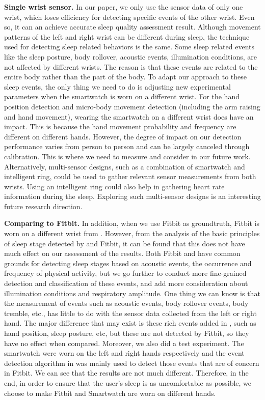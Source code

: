 \textbf{Single wrist sensor.} In our paper, we only use the sensor data of only one wrist, which loses efficiency for detecting specific events of the other wrist. Even so, it can an achieve accurate sleep quality assessment result. Although movement patterns of the left and right wrist can be different during sleep, the technique used for detecting sleep related behaviors is the same. Some sleep related events like the sleep posture, body rollover, acoustic events, illumination conditions, are not affected by different wrists. The reason is that these events are related to the entire body rather than the part of the body. To adapt our approach to these sleep events, the only thing we need to do is adjusting new experimental parameters when the smartwatch is worn on a different wrist. For the hand position detection and micro-body movement detection (including the arm 	raising and hand movement), wearing the smartwatch on a different wrist does have an impact. This is because the hand movement probability and frequency are different on different hands. However, the degree of impact on our detection performance varies from person to person and can be largely canceled through calibration. This is where we need to measure and consider in our future work. Alternatively, multi-sensor designs, such as a combination of smartwatch and intelligent ring, could be used to gather relevant sensor measurements from both wrists. Using an intelligent ring could also help in gathering heart rate information during the sleep. Exploring such multi-sensor designs is an interesting future research direction.

\textbf{Comparing to Fitbit.} In addition, when we use Fitbit as groundtruth, Fitbit is worn on a different wrist from {\systemname}. However, from the analysis of the basic principles of sleep stage detected by {\systemname} and Fitbit, it can be found that this does not have much effect on our assessment of the results. Both Fitbit and {\systemname} have common grounds for detecting sleep stages based on acoustic events, the occurrence and frequency of physical activity, but we go further to conduct more fine-grained detection and classification of these events, and add more consideration about illumination conditions and respiratory amplitude. One thing we can know is that the measurement of events such as acoustic events, body rollover events, body tremble, etc., has little to do with the sensor data collected from the left or right hand. The major difference that may exist is these rich events added in {\systemname}, such as hand position, sleep posture, etc,  but these are not detected by Fitbit, so they have no effect when compared. Moreover, we also did a test experiment. The smartwatch were worn on the left and right hands respectively and the event detection algorithm in {\systemname} was mainly used to detect those events that are of concern in Fitbit. We can see that the results are not much different. Therefore, in the end, in order to ensure that the user's sleep is as uncomfortable as possible, we choose to make Fitbit and Smartwatch are worn on different hands.


